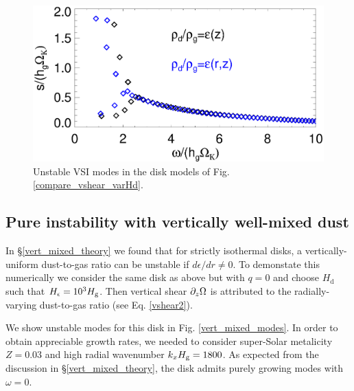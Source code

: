\begin{figure}
  \includegraphics[width=\linewidth]{figures/compare_eigenvals_varHd} 
  \caption{Unstable VSI modes in the disk models of
    Fig. \protect\ref{compare_vshear_varHd}.  
    \label{vsi_dust_varHd}
    }
\end{figure}

\subsection{Pure instability with vertically well-mixed
  dust}\label{vert_mixed} 

In \S\ref{vert_mixed_theory} we found that for strictly isothermal
disks, a vertically-uniform dust-to-gas ratio can be unstable
if $d\epsilon/dr\neq0$. To demonstate this numerically we consider the
same disk as above but with $q=0$ and choose $H_\mathrm{d}$ such
that $H_\epsilon=10^3H_\mathrm{g}$. Then vertical shear $\partial_z\Omega$ is attributed
to the radially-varying dust-to-gas ratio (see Eq. \ref{vshear2}).  

We show unstable modes for this disk in
Fig. \ref{vert_mixed_modes}. In order to obtain appreciable growth  
rates, we needed to consider super-Solar metalicity $Z=0.03$ and high
radial wavenumber $k_xH_\mathrm{g}=1800$. As expected from the discussion in
\S\ref{vert_mixed_theory}, the disk admits purely growing modes with
$\omega=0$. 

